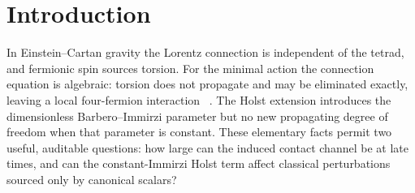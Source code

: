 \documentclass[aps,prd,twocolumn,superscriptaddress,showpacs,preprintnumbers,nofootinbib,longbibliography,floatfix]{revtex4-2}
\newcommand{\Neff}{N_{\rm eff}}
\begin{document}

\maketitle
\tableofcontents


\section{Introduction}\label{sec:intro}

In Einstein--Cartan gravity the Lorentz connection is independent of the
tetrad, and fermionic spin sources torsion.  For the minimal action the
connection equation is algebraic: torsion does not propagate and may be
eliminated exactly, leaving a local four-fermion interaction
~\cite{Hehl1976,HehlDattaNJL1971,Freidel2005}.  The Holst extension introduces
the dimensionless Barbero--Immirzi parameter but no new propagating degree of
freedom when that parameter is constant.  These elementary facts permit two
useful, auditable questions: how large can the induced contact channel be at
late times, and can the constant-Immirzi Holst term affect classical
perturbations sourced only by canonical scalars?
\end{document}
